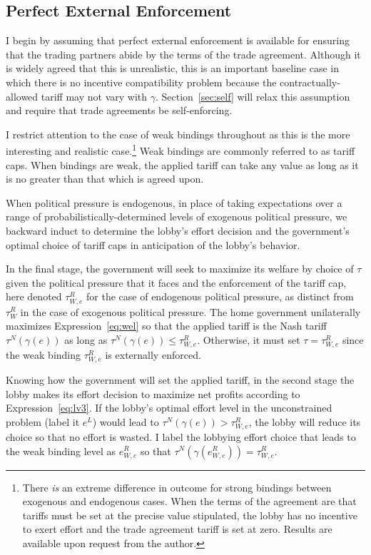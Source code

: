 \documentclass[12pt]{article}
\newcommand{\ga}{\gamma}
\begin{document}
\subsection{Perfect External Enforcement}
\label{sec:perfect}
I begin by assuming that perfect external enforcement is available for ensuring that the trading partners abide by the terms of the trade agreement. Although it is widely agreed that this is unrealistic, this is an important baseline case in which there is no incentive compatibility problem because the contractually-allowed tariff may not vary with $\ga$. Section~\ref{sec:self} will relax this assumption and require that trade agreements be self-enforcing.

I restrict attention to the case of weak bindings throughout as this is the more interesting and realistic case.\footnote{There \textit{is} an extreme difference in outcome for strong bindings between exogenous and endogenous cases. When the terms of the agreement are that tariffs must be set at the precise value stipulated, the lobby has no incentive to exert effort and the trade agreement tariff is set at zero. Results are available upon request from the author.} Weak bindings are commonly referred to as tariff caps. When bindings are weak, the applied tariff can take any value as long as it is no greater than that which is agreed upon.

When political pressure is endogenous, in place of taking expectations over a range of probabilistically-determined levels of exogenous political pressure, we backward induct to determine the lobby's effort decision and the government's optimal choice of tariff caps in anticipation of the lobby's behavior.

In the final stage, the government will seek to maximize its welfare by choice of $\tau$ given the political pressure that it faces and the enforcement of the tariff cap, here denoted $\tau_{W,e}^R$ for the case of endogenous political pressure, as distinct from $\tau_W^R$ in the case of exogenous political pressure. The home government unilaterally maximizes Expression~\ref{eq:wel} so that the applied tariff is the Nash tariff $\tau^N(\ga(e))$ as long as  $\tau^N(\ga(e)) \leq \tau_{W,e}^R$. Otherwise, it must set $\tau = \tau_{W,e}^R$ since the weak binding $\tau_{W,e}^R$ is externally enforced.

Knowing how the government will set the applied tariff, in the second stage the lobby makes its effort decision to maximize net profits according to Expression~\ref{eq:lv3}. If the lobby's optimal effort level in the unconstrained problem (label it $e^L$) would lead to $\tau^N(\ga(e)) > \tau_{W,e}^R$, the lobby will reduce its choice so that no effort is wasted. I label the lobbying effort choice that leads to the weak binding level as $e^R_{W,e}$ so that $\tau^N(\ga(e^R_{W,e})) = \tau_{W,e}^R$.
\end{document}
